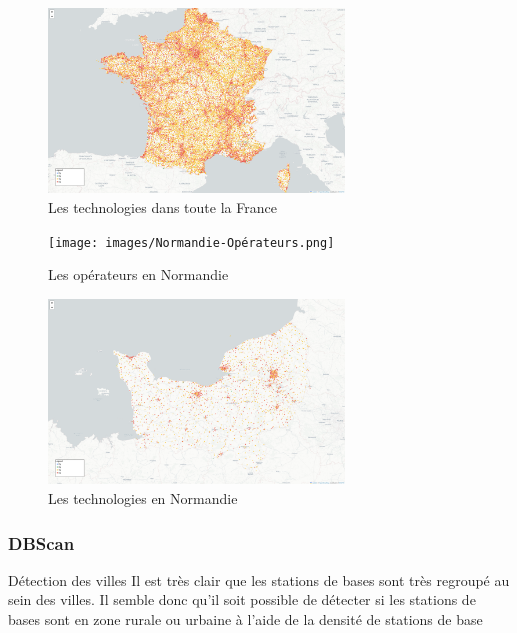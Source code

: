 {\begin{frame}{}
    \begin{figure}
        \includegraphics[width=0.7\textwidth]{images/France-Technologies.png}
        \caption{\label{fig:fr-tech}Les technologies dans toute la France}
    \end{figure}
\end{frame}

\begin{frame}{}
    \begin{figure}
        \texttt{[image: images/Normandie-Opérateurs.png]}
        \caption{\label{fig:no-op}Les opérateurs en Normandie}
    \end{figure}
\end{frame}

\begin{frame}{}
    \begin{figure}
        \includegraphics[width=0.7\textwidth]{images/Normandie-Technologies.png}
        \caption{\label{fig:no-tech}Les technologies en Normandie}
    \end{figure}
\end{frame}

\subsubsection{DBScan}
\begin{frame}{Détection des villes}
    Il est très clair que les stations de bases sont très regroupé au sein des villes. Il semble donc qu'il soit possible de détecter si les stations de bases sont en zone rurale ou urbaine à l'aide de la densité de stations de base


\end{frame}}
